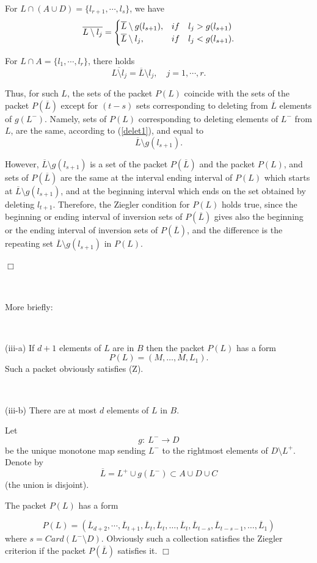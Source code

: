 \documentclass[12pt,a4paper]{article}
\begin{document}
 For $L\cap (A\cup D)=\{l_{r+1}, \cdots, l_s\}$,
 we have 
  \[\overline{L\setminus l_{j}}= \begin{cases}
  \overline L\setminus g(l_{s+1}), & if \quad l_j>g(l_{s+1})\cr
   \overline L\setminus l_j, & if  \quad l_j<g(l_{s+1}).
   \end{cases}
 \] 
 
 For $L\cap A=\{l_1, \cdots, l_r\}$, there holds
   \[\overline{L\setminus l_{j}}= \overline L\setminus l_j, \quad j=1, \cdots, r.
 \]
 
Thus, for such $L$,  the sets of the packet $P(L)$  coincide with the sets of the packet $P(\overline L)$
except for $(t-s)$ sets corresponding to deleting from $\overline L$ elements of $g(L^-)$. Namely, sets of $P(L)$ corresponding to deleting elements of $L^-$ from $L$,
are the same, according to (\ref{delet1}), and equal  to   
\[
 \overline L\setminus g(l_{s+1}).\]
 
However, $\overline L\setminus g(l_{s+1})$ is a set of the packet  $P(\overline L)$ and the packet $P(L)$, and  sets of $P(\overline L)$ are the same at the interval  ending interval of $P(L)$ which starts at 
$\overline L\setminus g(l_{s+1})$, and 
 at the beginning interval which ends on the set obtained by deleting $l_{t+1}$. Therefore, the Ziegler condition for $P(L)$ holds true, since the beginning  or ending interval of  inversion sets of $P(\overline L)$  gives also the beginning  or the ending interval of  inversion sets of $P(\overline L)$, and the difference is the repeating set $\overline L\setminus g(l_{s+1})$ in $P(L)$.

\hfill $\Box$

\

More briefly:

\

 (iii-a) If  $d+1$ elements of $L$ are  in $B$ then the packet $P(L)$ has a form 
 \[
 P(L) = (M,\ldots,M, L_1).
 \] 
 Such a packet obviously satisfies (Z). 

\

(iii-b) There are at most $d$ elements of $L$ in $B$. 

Let 
 \[
 g:\ L^- \to D  
 \]
 be the unique monotone map sending $L^-$ to the rightmost elements of $D\setminus L^+$. 
 Denote by 
 \[
 \overline L=L^+\cup g(L^-)\subset A\cup D\cup C
 \]
 (the union is disjoint).
  

The packet $P(L)$ has a form 

\[
P(L) = 
(\overline L_{d+2}, \cdots, \overline L_{t+1},\overline L_t,\overline L_t, \ldots, \overline L_t, \overline L_{t-s}, \overline L_{t-s-1},\ldots, \overline L_1)
\] 
where $s = Card(L^-\setminus D)$. Obviously such a collection satisfies the Ziegler criterion if the packet  
$P(\overline L)$ satisfies it. $\Box$
\end{document}
